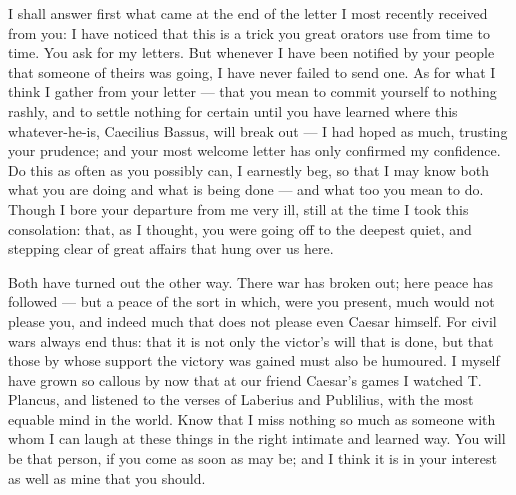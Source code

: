 

 I shall answer first what came at the end of the letter I most recently received from you: I have noticed that this is a trick you great orators use from time to time. You ask for my letters. But whenever I have been notified by your people that someone of theirs was going, I have never failed to send one. As for what I think I gather from your letter --- that you mean to commit yourself to nothing rashly, and to settle nothing for certain until you have learned where this whatever-he-is, Caecilius Bassus, will break out --- I had hoped as much, trusting your prudence; and your most welcome letter has only confirmed my confidence. Do this as often as you possibly can, I earnestly beg, so that I may know both what you are doing and what is being done --- and what too you mean to do. Though I bore your departure from me very ill, still at the time I took this consolation: that, as I thought, you were going off to the deepest quiet, and stepping clear of great affairs that hung over us here.

 Both have turned out the other way. There war has broken out; here peace has followed --- but a peace of the sort in which, were you present, much would not please you, and indeed much that does not please even Caesar himself. For civil wars always end thus: that it is not only the victor's will that is done, but that those by whose support the victory was gained must also be humoured. I myself have grown so callous by now that at our friend Caesar's games I watched T. Plancus, and listened to the verses of Laberius and Publilius, with the most equable mind in the world. Know that I miss nothing so much as someone with whom I can laugh at these things in the right intimate and learned way. You will be that person, if you come as soon as may be; and I think it is in your interest as well as mine that you should.
